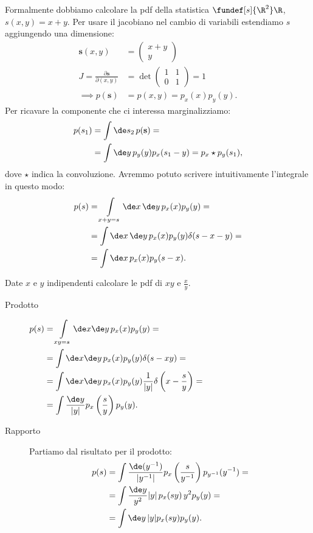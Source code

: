 \begin{solution*}
	Formalmente dobbiamo calcolare la pdf della statistica $\fundef[s]{\R^2}\R$,
	$s(x,y)=x+y$.
	Per usare il jacobiano nel cambio di variabili estendiamo $s$ aggiungendo una dimensione:
	\begin{align*}
		\mathbf s(x,y) &= \left(\begin{matrix}
			x+y \\
			y
		\end{matrix} \right) \\
		J = \frac{\partial\mathbf s}{\partial(x,y)} &= \det\left(\begin{matrix}
			1 & 1 \\
			0 & 1
		\end{matrix}\right) = 1 \\
		\implies p(\mathbf s) &= p(x,y) = p_x(x)p_y(y).
	\end{align*}
	Per ricavare la componente che ci interessa marginalizziamo:
	\begin{align*}
		p(s_1) &= \int \de s_2\, p(\mathbf s) = \\
		&= \int \de y\, p_y(y) p_x(s_1 - y) = p_x \star p_y (s_1),
	\end{align*}
	dove $\star$ indica la convoluzione.
	Avremmo potuto scrivere intuitivamente l'integrale in questo modo:
	\begin{align*}
		p(s) &= \int\limits_{x+y = s} \de x\,\de y\, p_x(x) p_y(y) = \\
		&= \int \de x\,\de y\, p_x(x) p_y(y) \delta(s - x - y) = \\
		&= \int \de x\, p_x(x) p_y(s-x).
	\end{align*}
\end{solution*}

\begin{exercise}
	Date $x$ e $y$ indipendenti calcolare le pdf di $xy$ e $\frac xy$.
\end{exercise}

\begin{solution}
	\begin{description}
		\item[Prodotto]
			$\begin{aligned}[t]
				p(s) &= \int\limits_{xy=s} \de x\de y\, p_x(x) p_y(y) = \\
				&= \int\de x\de y\, p_x(x)p_y(y)\delta(s-xy) = \\
				&= \int\de x\de y\, p_x(x)p_y(y)\frac1{|y|}\delta\left(x-\frac sy\right) = \\
				&= \int\frac{\de y}{|y|}p_x\left(\frac sy\right)p_y(y).
			\end{aligned}$
		\item[Rapporto]
			Partiamo dal risultato per il prodotto:
			\begin{align*}
				p(s) &= \int\frac{\de(y^{-1})}{|y^{-1}|}p_x\left(\frac s{y^{-1}}\right)p_{y^{-1}}(y^{-1}) = \\
				&= \int\frac{\de y}{y^2}|y|\,p_x(sy)\,y^2 p_y(y) = \\
				&= \int\de y\, |y|p_x(sy)p_y(y).
			\end{align*}
	\end{description}
\end{solution}


